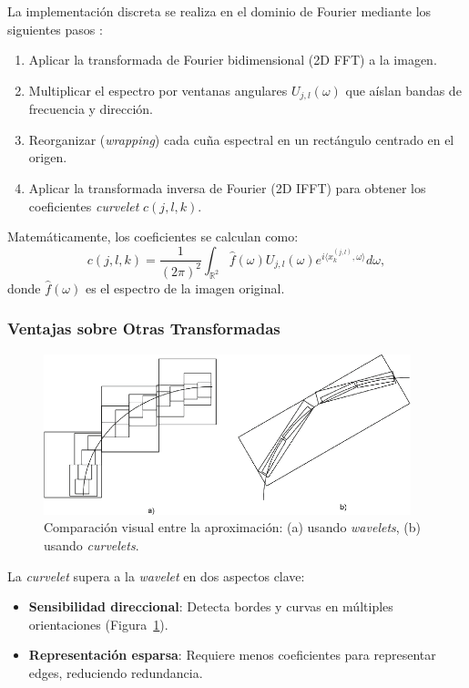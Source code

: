 La implementación discreta se realiza en el dominio de Fourier mediante los siguientes pasos \cite{FastCurveletTransform}:
\begin{enumerate}
    \item Aplicar la transformada de Fourier bidimensional (2D FFT) a la imagen.
    \item Multiplicar el espectro por ventanas angulares \(U_{j,l}(\omega)\) que aíslan bandas de frecuencia y dirección.
    \item Reorganizar (\emph{wrapping}) cada cuña espectral en un rectángulo centrado en el origen.
    \item Aplicar la transformada inversa de Fourier (2D IFFT) para obtener los coeficientes \textit{curvelet} \(c(j,l,k)\).
\end{enumerate}

Matemáticamente, los coeficientes se calculan como:
\[
c(j,l,k) = \frac{1}{(2\pi)^2} \int_{\mathbb{R}^2} \hat{f}(\omega) U_{j,l}(\omega) e^{i\langle x_k^{(j,l)}, \omega \rangle} d\omega,
\]
donde \(\hat{f}(\omega)\) es el espectro de la imagen original.

\subsubsection{Ventajas sobre Otras Transformadas}

\begin{figure}[H]
    \centering
    \includegraphics[width=0.95\textwidth]{Graphics/Comparison-between-approximation-using-a-wavelet-and-b-curvelet-12.png}
    \caption{Comparación visual entre la aproximación: (a) usando \textit{wavelets}, (b) usando \textit{curvelets}. \cite{comparison}}
    \label{fig:comparison-wavelet-curvelet}
\end{figure}

La \textit{curvelet} supera a la \textit{wavelet} en dos aspectos clave:
\begin{itemize}
    \item \textbf{Sensibilidad direccional}: Detecta bordes y curvas en múltiples orientaciones (Figura~\ref{fig:comparison-wavelet-curvelet}).
    \item \textbf{Representación esparsa}: Requiere menos coeficientes para representar edges, reduciendo redundancia.
\end{itemize}

